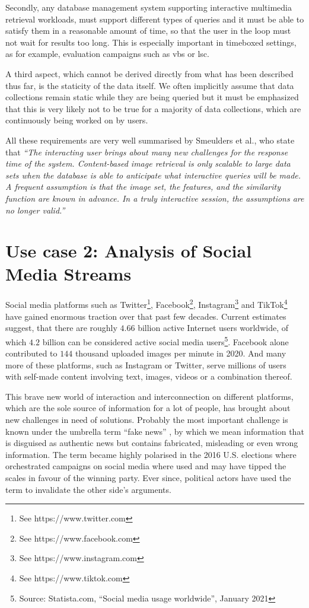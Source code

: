 Secondly, any database management system supporting interactive multimedia retrieval workloads, must support different types of queries and it must be able to satisfy them in a reasonable amount of time, so that the user in the loop must not wait for results too long. This is especially important in timeboxed settings, as for example, evaluation campaigns such as \acrshort{vbs} or \acrshort{lsc}.

A third aspect, which cannot be derived directly from what has been described thus far, is the staticity of the data itself. We often implicitly assume that data collections remain static while they are being queried but it must be emphasized that this is very likely not to be true for a majority of data collections, which are continuously being worked on by users. 

All these requirements are very well summarised by Smeulders et al., who state that \emph{``The interacting user brings about many new challenges for the response time of the system. Content-based image retrieval is only scalable to large data sets when the database is able to anticipate what interactive queries will be made. A frequent assumption is that the image set, the features, and the similarity function are known in advance. In a truly interactive session, the assumptions are no longer valid.''} \cite{Smeulders:2000Content}

\section{Use case 2: Analysis of Social Media Streams}
\label{section:application_online_analysis}

Social media platforms such as Twitter\footnote{See https://www.twitter.com}, Facebook\footnote{See https://www.facebook.com}, Instagram\footnote{See https://www.instagram.com} and TikTok\footnote{See https://www.tiktok.com} have gained enormous traction over that past few decades. Current estimates suggest, that there are roughly $4.66$ billion active Internet users worldwide, of which $4.2$ billion can be considered active social media users\footnote{Source: Statista.com, ``Social media usage worldwide'', January 2021}. Facebook alone contributed to $144$ thousand uploaded images per minute in 2020. And many more of these  platforms, such as Instagram or Twitter, serve millions of users with self-made content involving text, images, videos or a combination thereof.

This brave new world of interaction and interconnection on different platforms, which are the sole source of information for a lot of people, has brought about new challenges in need of solutions. Probably the most important challenge is known under the umbrella term ``fake news'' \cite{Lazer:2018Science}, by which we mean information that is disguised as authentic news but contains fabricated, misleading or even wrong information. The term became highly polarised in the 2016 U.S. elections \cite{Quandt:2019Fake} where orchestrated campaigns on social media where used and may have tipped the scales in favour of the winning party. Ever since, political actors have used the term to invalidate the other side's arguments.

